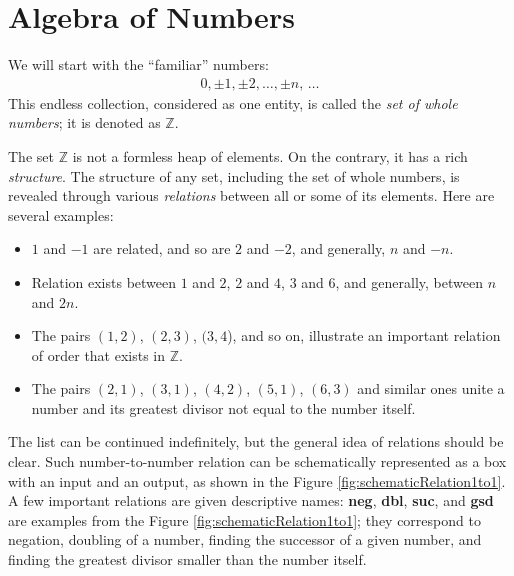 \section{Algebra of Numbers}

We will start with the ``familiar'' numbers:
\begin{align*}
  0,\pm 1, \pm 2, \ldots, \pm n,\,\ldots
\end{align*}
This endless collection, considered as one entity, is called the
\emph{set of whole numbers}; it is denoted as $\mathbb{Z}$.

The set $\mathbb{Z}$ is not a formless heap of elements. On the
contrary, it has a rich \emph{structure}. The structure of any set, including
the set of whole numbers, is
revealed through various \emph{relations} between all or some of its
elements. Here are several examples:
\begin{itemize}
  \item $1$ and $-1$ are related, and so are $2$ and
    $-2$, and generally, $n$ and $-n$.
  \item Relation exists between $1$ and $2$, $2$ and $4$, $3$ and $6$,
    and generally, between $n$ and $2n$.
  \item The pairs $(1,2)$, $(2,3)$, $(3, 4$), and so on, illustrate an
    important relation of order that exists in $\mathbb{Z}$.
  \item The pairs $(2, 1)$, $(3, 1)$, $(4, 2)$, $(5, 1)$, $(6, 3)$ and
    similar ones unite a number and its greatest divisor not equal to
    the number itself.
\end{itemize}
The list can be continued indefinitely, but the general idea of
relations should be
clear. Such number-to-number relation can be schematically represented
as a box with an input and an output, as shown in the Figure
\ref{fig:schematicRelation1to1}. A few important relations are given
descriptive names: {\bf neg}, {\bf dbl}, {\bf suc}, and {\bf gsd}
are examples from the Figure \ref{fig:schematicRelation1to1}; they
correspond to negation, doubling of a number, finding the successor of
a given number, and finding the greatest divisor smaller than the
number itself.
